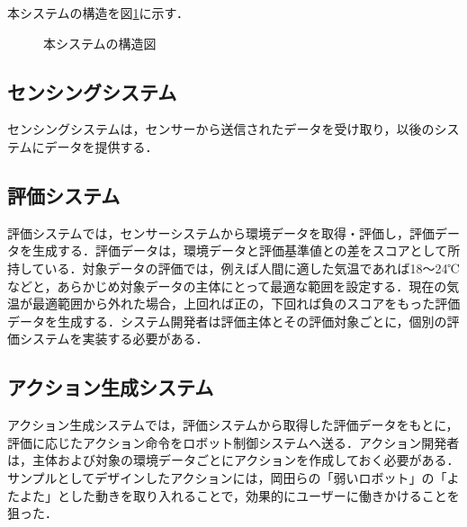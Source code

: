 \documentclass[paper=a4paper,jafontsize=9pt,head_space=15mm,gutter=20mm,
twocolumn,number_of_lines=49, line_length=26zw]{myuarticle}
\begin{document}
本システムの構造を図\ref{fig:system-structure}に示す．

\fboxsep=0pt            %
\fboxrule=1pt            %
\begin{figure}[h]
  \centering
  \caption{本システムの構造図}
  \label{fig:system-structure}
\end{figure}

\subsection{センシングシステム}

センシングシステムは，センサーから送信されたデータを受け取り，以後のシステムにデータを提供する．

\subsection{評価システム}
評価システムでは，センサーシステムから環境データを取得・評価し，評価データを生成する．評価データは，環境データと評価基準値との差をスコアとして所持している．対象データの評価では，例えば人間に適した気温であれば18～24℃などと，あらかじめ対象データの主体にとって最適な範囲を設定する．現在の気温が最適範囲から外れた場合，上回れば正の，下回れば負のスコアをもった評価データを生成する．システム開発者は評価主体とその評価対象ごとに，個別の評価システムを実装する必要がある．

\subsection{アクション生成システム}
アクション生成システムでは，評価システムから取得した評価データをもとに，評価に応じたアクション命令をロボット制御システムへ送る．アクション開発者は，主体および対象の環境データごとにアクションを作成しておく必要がある．サンプルとしてデザインしたアクションには，岡田ら\cite{岡田-2017-弱いロボ}の「弱いロボット」の「よたよた」とした動きを取り入れることで，効果的にユーザーに働きかけることを狙った．
\end{document}

